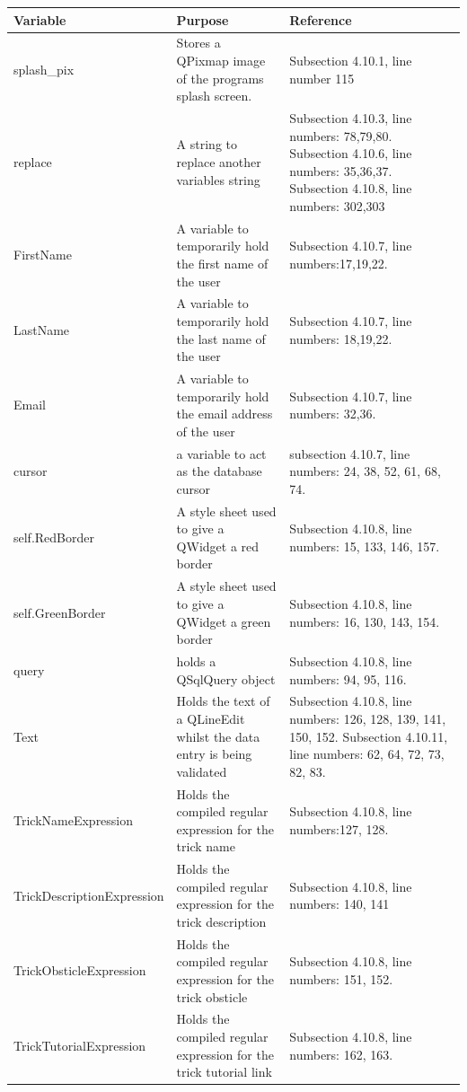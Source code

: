 \begin{center}
\begin{longtable}{|p{3.5cm}|p{6cm}|p{3.5cm}|} \hline
\textbf{Variable} & \textbf{Purpose} & \textbf{Reference} \\ \hline
splash\_pix & Stores a QPixmap image of the programs splash screen. & Subsection 4.10.1, line number 115 \\ \hline
replace & A string to replace another variables string & Subsection 4.10.3, line numbers: 78,79,80. Subsection 4.10.6, line numbers: 35,36,37. Subsection 4.10.8, line numbers: 302,303 \\ \hline
FirstName & A variable to temporarily hold the first name of the user & Subsection 4.10.7, line numbers:17,19,22. \\ \hline
LastName & A variable to temporarily hold the last name of the user & Subsection 4.10.7, line numbers: 18,19,22. \\ \hline
Email & A variable to temporarily hold the email address of the user & Subsection 4.10.7, line numbers: 32,36. \\ \hline
cursor & a variable to act as the database cursor & subsection 4.10.7, line numbers: 24, 38, 52, 61, 68, 74. \\ \hline
self.RedBorder & A style sheet used to give a QWidget a red border & Subsection 4.10.8, line numbers: 15, 133, 146, 157. \\ \hline
self.GreenBorder & A style sheet used to give a QWidget a green border & Subsection 4.10.8, line numbers: 16, 130, 143, 154. \\ \hline
query & holds a QSqlQuery object & Subsection 4.10.8, line numbers: 94, 95, 116. \\ \hline
Text & Holds the text of a QLineEdit whilst the data entry is being validated &Subsection 4.10.8, line numbers: 126, 128, 139, 141, 150, 152. Subsection 4.10.11, line numbers: 62, 64, 72, 73, 82, 83. \\ \hline
TrickNameExpression & Holds the compiled regular expression for the trick name & Subsection 4.10.8, line numbers:127, 128. \\ \hline
TrickDescriptionExpression & Holds the compiled regular expression for the trick description & Subsection 4.10.8, line numbers: 140, 141 \\ \hline
TrickObsticleExpression & Holds the compiled regular expression for the trick obsticle &Subsection 4.10.8, line numbers: 151, 152. \\ \hline
TrickTutorialExpression & Holds the compiled regular expression for the trick tutorial link & Subsection 4.10.8, line numbers: 162, 163. \\ \hline

\end{longtable}
\end{center}

